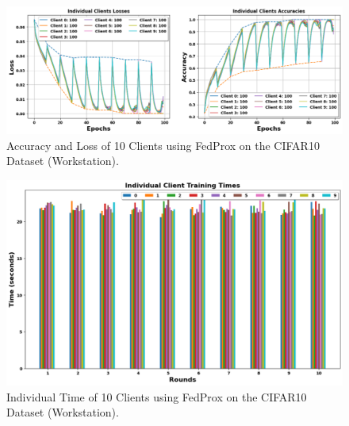 \documentclass[conference]{IEEEtran}
\begin{document}
\begin{figure}[htp!]
	\centering
	\includegraphics[scale=.28]{Images/NEWGRAPHS/3.png }
	\caption{Accuracy and Loss of 10 Clients using FedProx on the CIFAR10 Dataset (Workstation).}
	\label{FedProxC10}
\end{figure}

\begin{figure}[htp!]
	\centering
	\includegraphics[scale=.3]{Images/NEWGRAPHS/4.png }
	\caption{Individual Time of 10 Clients using FedProx on the CIFAR10 Dataset (Workstation).}
	\label{FedProxTimeC10}
\end{figure}


%
\end{document}
